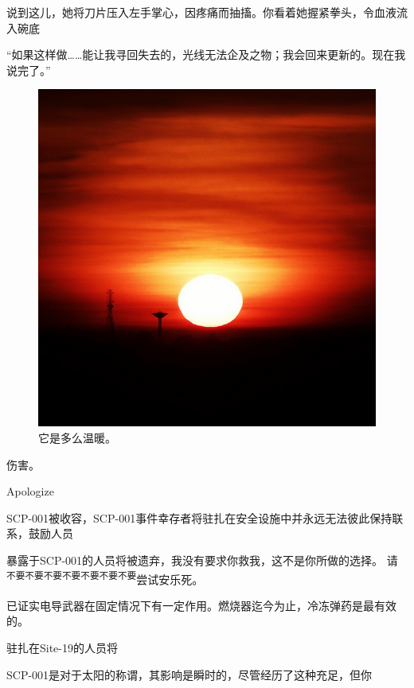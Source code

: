 \begin{scpbox}
说到这儿，她将刀片压入左手掌心，因疼痛而抽搐。你看着她握紧拳头，令血液流入碗底
\end{scpbox}

\begin{scpdialog}
“如果这样做……能让我寻回失去的，光线无法企及之物；我会回来更新的。现在我说完了。”
\end{scpdialog}

\hr


\hr


\begin{figure}[H]
	\centering
	\includegraphics[width=0.5\linewidth]{images/SCP.001.when.night.breaks.2.jpg}
	\caption*{它是多么温暖。}
\end{figure}

伤害。

Apologize

SCP-001被收容，SCP-001事件幸存者将驻扎在安全设施中并永远无法彼此保持联系，鼓励人员


暴露于SCP-001的人员将被遗弃，我没有要求你救我，这不是你所做的选择。 请\textsuperscript{
不要不要不要不要不要不要不要}尝试安乐死。

已证实电导武器在固定情况下有一定作用。燃烧器迄今为止，冷冻弹药是最有效的。

驻扎在Site-19的人员将

SCP-001是对于太阳的称谓，其影响是瞬时的，尽管经历了这种充足，但你

